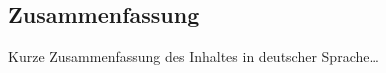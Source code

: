 \begingroup
\let\clearpage\relax
\let\cleardoublepage\relax
\let\cleardoublepage\relax

\cleardoublepage

\begin{otherlanguage}{ngerman}
	\chapter*{Zusammenfassung}
	Kurze Zusammenfassung des Inhaltes in deutscher Sprache\dots
\end{otherlanguage}

\endgroup

\vfill
